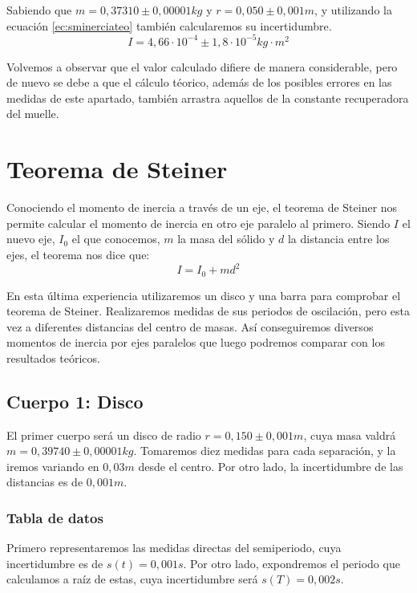 \documentclass[12pt, a4paper, titlepage]{article}
\begin{document}
  Sabiendo que $m = 0,37310 \pm 0,00001 kg$ y $r = 0,050 \pm 0,001 m$, y utilizando la ecuación \ref{ec:sminerciateo} también calcularemos su incertidumbre.
  \begin{equation*}
    I = 4,66 \cdot 10^{-4} \pm 1,8 \cdot 10^{-5} kg \cdot m^2
  \end{equation*}

  Volvemos a observar que el valor calculado difiere de manera considerable, pero de nuevo se debe a que el cálculo téorico, además de los posibles errores en las medidas de este apartado, también arrastra aquellos de la constante recuperadora del muelle.


  \newpage
  \section{Teorema de Steiner}

  Conociendo el momento de inercia a través de un eje, el teorema de Steiner nos permite calcular el momento de inercia en otro eje paralelo al primero. Siendo $I$ el nuevo eje, $I_0$ el que conocemos, $m$ la masa del sólido y $d$ la distancia entre los ejes, el teorema nos dice que:
  \begin{equation}
    I = I_0 + md^2 \label{ec:steiner}
  \end{equation}

  En esta última experiencia utilizaremos un disco y una barra para comprobar el teorema de Steiner. Realizaremos medidas de sus periodos de oscilación, pero esta vez a diferentes distancias del centro de masas. Así conseguiremos diversos momentos de inercia por ejes paralelos que luego podremos comparar con los resultados teóricos.

  \subsection{Cuerpo 1: Disco}

  El primer cuerpo será un disco de radio $r = 0,150 \pm 0,001 m$, cuya masa valdrá $m = 0,39740 \pm 0,00001 kg$. Tomaremos diez medidas para cada separación, y la iremos variando en $0,03 m$ desde el centro. Por otro lado, la incertidumbre de las distancias es de $0,001m$.

  \subsubsection{Tabla de datos}

  Primero representaremos las medidas directas del semiperiodo, cuya incertidumbre es de $s(t) = 0,001s$. Por otro lado, expondremos el periodo que calculamos a raíz de estas, cuya incertidumbre será $s(T) = 0,002s$.
\end{document}
